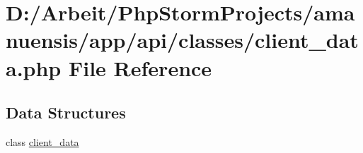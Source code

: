\hypertarget{client__data_8php}{}\section{D\+:/\+Arbeit/\+Php\+Storm\+Projects/amanuensis/app/api/classes/client\+\_\+data.php File Reference}
\label{client__data_8php}
\subsection*{Data Structures}
\begin{DoxyCompactItemize}
\item 
class \hyperlink{classclient__data}{client\+\_\+data}
\end{DoxyCompactItemize}
